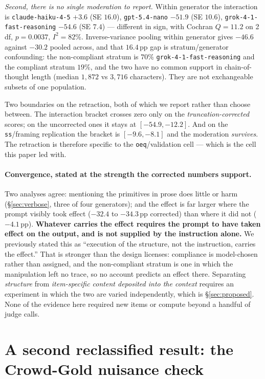 \documentclass[11pt]{article}
\newcommand{\nano}{\texttt{gpt-5.4-nano}}
\newcommand{\haiku}{\texttt{claude-haiku-4-5}}
\newcommand{\grok}{\texttt{grok-4-1-fast-reasoning}}
\begin{document}
\emph{Second, there is no single moderation to report.} Within generator the
interaction is \haiku{} $+3.6$ (SE $16.0$), \nano{} $-51.9$ (SE $10.6$),
\grok{} $-54.6$ (SE $7.4$) --- different in sign, with Cochran $Q = 11.2$ on
2\,df, $p = 0.0037$, $I^2 = 82\%$. Inverse-variance pooling within generator
gives $-46.6$ against $-30.2$ pooled across, and that $16.4$\,pp gap is
stratum/generator confounding: the non-compliant stratum is $70\%$ \grok{} and
the compliant stratum $19\%$, and the two have no common support in
chain-of-thought length (median $1{,}872$ vs $3{,}716$ characters). They are not
exchangeable subsets of one population.

Two boundaries on the retraction, both of which we report rather than choose
between. The interaction bracket crosses zero only on the \emph{truncation-corrected}
scores; on the uncorrected ones it stays at $[-54.9, -12.2]$. And on the
\texttt{ss}/framing replication the bracket is $[-9.6, -8.1]$ and the moderation
\emph{survives}. The retraction is therefore specific to the
\texttt{oeq}/validation cell --- which is the cell this paper led with.

\paragraph{Convergence, stated at the strength the corrected numbers support.}
Two analyses agree: mentioning the primitives in prose does little or harm
(\S\ref{sec:verbose}, three of four generators); and the effect is far larger
where the prompt visibly took effect ($-32.4$ to $-34.3$\,pp corrected) than
where it did not ($-4.1$\,pp). \textbf{Whatever carries the effect requires the
prompt to have taken effect on the output, and is not supplied by the
instruction alone.} We previously stated this as ``execution of the structure,
not the instruction, carries the effect.'' That is stronger than the design
licenses: compliance is model-chosen rather than assigned, and the non-compliant
stratum is one in which the manipulation left no trace, so no account predicts
an effect there. Separating \emph{structure} from \emph{item-specific content
deposited into the context} requires an experiment in which the two are varied
independently, which is \S\ref{sec:proposed}. None of the evidence here required new items or
compute beyond a handful of judge calls.

\section{A second reclassified result: the Crowd-Gold nuisance check}
\label{sec:crowdgold}
\end{document}
